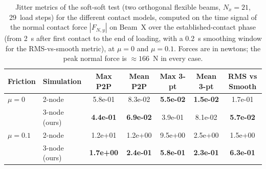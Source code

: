 \begin{table}[ht]
    \centering
    \small
    \caption{Jitter metrics of the soft-soft test (two orthogonal flexible beams, $N_x = 21$, 29~load steps) for the different contact models, computed on the time signal of the normal contact force $|F_{N,y}|$ on Beam~X over the established-contact phase (from 2~s after first contact to the end of loading, with a 0.2~s smoothing window for the RMS-vs-smooth metric), at $\mu = 0$ and $\mu = 0.1$. Forces are in newtons; the peak normal force is $\approx 166$~N in every case.}
    \label{tab:metrics_jitter_soft_soft}
    \begin{tabular}{llccccc}
        \toprule
        Friction & Simulation & Max P2P & Mean P2P & Max 3-pt & Mean 3-pt & RMS vs Smooth \\
        \midrule
        $\mu = 0$ & 2-node & 5.8e-01 & 8.3e-02 & \textbf{5.5e-02} & \textbf{1.5e-02} & 1.7e-01 \\
         & 3-node (ours) & \textbf{4.4e-01} & \textbf{6.9e-02} & 3.9e-01 & 8.1e-02 & \textbf{5.7e-02} \\
        \midrule
        $\mu = 0.1$ & 2-node & 1.2e+01 & 1.2e+00 & 9.5e+00 & 2.5e+00 & 1.5e+00 \\
         & 3-node (ours) & \textbf{1.7e+00} & \textbf{2.4e-01} & \textbf{5.8e-01} & \textbf{2.3e-01} & \textbf{6.3e-01} \\
        \bottomrule
    \end{tabular}
\end{table}
